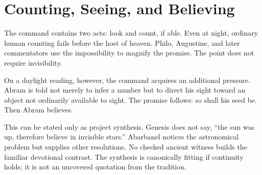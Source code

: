 \section{Counting, Seeing, and Believing}

The command contains two acts: look and count, if able. Even at night, ordinary
human counting fails before the host of heaven. Philo, Augustine, and later
commentators use the impossibility to magnify the promise. The point does not
require invisibility.

On a daylight reading, however, the command acquires an additional pressure.
Abram is told not merely to infer a number but to direct his sight toward an
object not ordinarily available to sight. The promise follows: so shall his
seed be. Then Abram believes.

This can be stated only as project synthesis. Genesis does not say, ``the sun
was up, therefore believe in invisible stars.'' Abarbanel notices the
astronomical problem but supplies other resolutions. No checked ancient witness
builds the familiar devotional contrast. The synthesis is canonically fitting
if continuity holds; it is not an uncovered quotation from the tradition.

